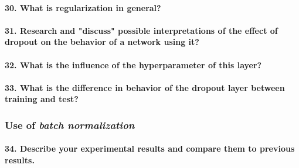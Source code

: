 \documentclass{article}
\theoremstyle{plain}%
\theoremstyle{definition}
\theoremstyle{remark}
\begin{document}
\paragraph{30. What is regularization in general?}

\paragraph{31. Research and "discuss" possible interpretations of the effect of dropout on the behavior of a network using it?}

\paragraph{32. What is the influence of the hyperparameter of this layer?}

\paragraph{33. What is the difference in behavior of the dropout layer between training and test?}

\subsubsection{Use of \textit{batch normalization}}

\paragraph{34. Describe your experimental results and compare them to previous results.}
\end{document}
